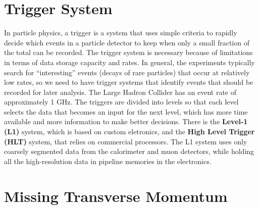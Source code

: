 \section{Trigger System}
In particle physics, a trigger is a system that uses simple criteria to rapidly decide which events in a particle detector to keep when only a small fraction of the total can be recorded.
The trigger system is necessary because of limitations in terms of data storage capacity and rates. 
In general, the experiments typically search for ``interesting'' events (decays of rare particles) that occur at relatively low rates, so we need to have trigger systems that identify events that should be recorded for later analysis. 
The Large Hadron Collider has an event rate of approximately 1 GHz. 
The triggers are divided into levels so that each level selects the data that becomes an input for the next level, which has more time available and more information to make better decisions.
There is the \textbf{Level-1 (L1)} system, which is based on custom eletronics, and the \textbf{High Level Trigger (HLT)} system, that relies on commercial processors. 
The L1 system uses only coarsely segmented data from the calorimeter and muon detectors, while holding all the high-resolution data in pipeline memories in the electronics.
\section{Missing Transverse Momentum}

